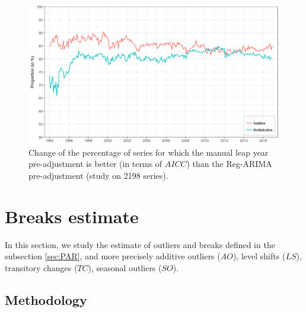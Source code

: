 \documentclass[12pt, a4paper]{article}
\begin{document}
\begin{figure}
[!ht]
\begin{center}
 \includegraphics[scale=0.65]{img/LYaicc.png}
 \caption[Change of the percentage of series for which the manual leap year pre-adjustment is better (in terms of $AICC$) than the Reg-ARIMA pre-adjustment (study on 2198 series)]{
Change of the percentage of series for which the manual leap year pre-adjustment is better (in terms of $AICC$) than the Reg-ARIMA pre-adjustment (study on 2198 series).}
 \label{fig:LYaicc}
\end{center}
\end{figure}

\clearpage

\section{Breaks estimate}
\label{sec:AO}

In this section, we study the estimate of outliers and breaks defined in the subsection \ref{sec:PAR}, and more precisely additive outliers ($AO$), level shifts ($LS$), transitory changes ($TC$), seasonal outliers ($SO$).

\subsection{Methodology}
\end{document}
